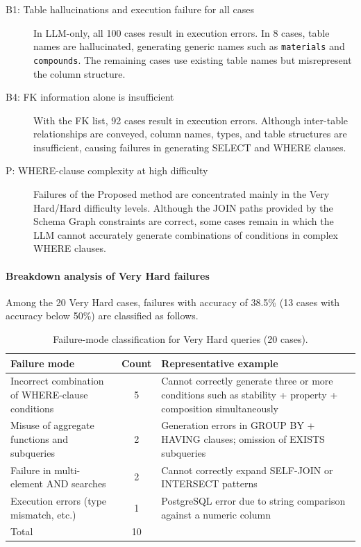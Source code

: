 \documentclass[5p,twocolumn]{elsarticle}
\begin{document}
\begin{description}
  \item[B1: Table hallucinations and execution failure for all cases]
    In LLM-only, all 100 cases result in execution errors. In 8 cases, table names are hallucinated,
    generating generic names such as \texttt{materials} and \texttt{compounds}.
    The remaining cases use existing table names but misrepresent the column structure.
  \item[B4: FK information alone is insufficient]
    With the FK list, 92 cases result in execution errors.
    Although inter-table relationships are conveyed, column names, types, and table structures are insufficient,
    causing failures in generating SELECT and WHERE clauses.
  \item[P: WHERE-clause complexity at high difficulty]
    Failures of the Proposed method are concentrated mainly in the Very Hard/Hard difficulty levels.
    Although the JOIN paths provided by the Schema Graph constraints are correct,
    some cases remain in which the LLM cannot accurately generate combinations of conditions in complex WHERE clauses.
\end{description}

\paragraph{Breakdown analysis of Very Hard failures}

Among the 20 Very Hard cases, failures with accuracy of 38.5\% (13 cases with accuracy below 50\%) are classified as follows.

\begin{table}[htbp]
  \centering
  \caption{Failure-mode classification for Very Hard queries (20 cases).}
  \label{tab:vhard_failure}
  \small
  \begin{tabular}{lcp{5.2cm}}
    \toprule
    Failure mode & Count & Representative example \\
    \midrule
    Incorrect combination of WHERE-clause conditions & 5 & Cannot correctly generate three or more conditions such as stability + property + composition simultaneously \\
    Misuse of aggregate functions and subqueries & 2 & Generation errors in GROUP BY + HAVING clauses; omission of EXISTS subqueries \\
    Failure in multi-element AND searches & 2 & Cannot correctly expand SELF-JOIN or INTERSECT patterns \\
    Execution errors (type mismatch, etc.) & 1 & PostgreSQL error due to string comparison against a numeric column \\
    \midrule
    Total & 10 & \\
    \bottomrule
  \end{tabular}
\end{table}
\end{document}
